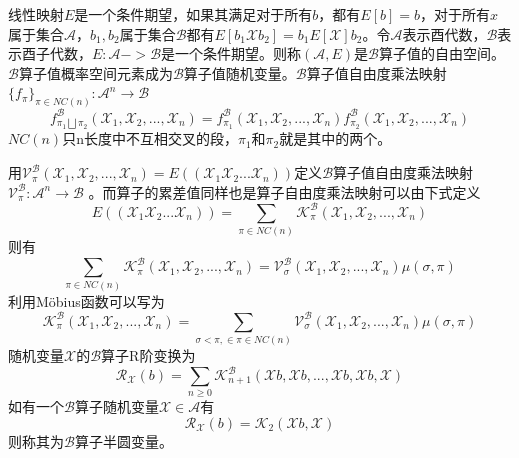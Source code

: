 \documentclass[bachelor,nocolorlinks, printoneside]{seuthesis} %
\begin{document}
\begin{Main}
线性映射$E$是一个条件期望，如果其满足对于所有$b$，都有$E[b]=b$，对于所有$x$属于集合$\mathcal{A}$，$b_1,b_2$属于集合$\mathcal{B}$都有$E[b_1\mathcal{X}b_2]= b_1E[\mathcal{X}]b_2$。令$\mathcal{A}$表示酉代数，$\mathcal{B}$表示酉子代数，$E:\mathcal{A}->\mathcal{B}$是一个条件期望。则称$(\mathcal{A},E)$是$\mathcal{B}$算子值的自由空间。$\mathcal{B}$算子值概率空间元素成为$\mathcal{B}$算子值随机变量。$\mathcal{B}$算子值自由度乘法映射$\lbrace f_{\pi} \rbrace _{\pi \in NC(n)}:\mathcal{A}^n \rightarrow \mathcal{B}$
\begin{equation}\label{key}
f_{\pi_1 \bigsqcup \pi_2}^{\mathcal{B}}(\mathcal{X}_1,\mathcal{X}_2,...,\mathcal{X}_n) = f_{\pi_1}^{\mathcal{B}}(\mathcal{X}_1,\mathcal{X}_2,...,\mathcal{X}_n)f_{\pi_2}^{\mathcal{B}}(\mathcal{X}_1,\mathcal{X}_2,...,\mathcal{X}_n)
\end{equation}
$NC(n)$只n长度中不互相交叉的段，$\pi_1$和$\pi_2$就是其中的两个。

用$\mathcal{V}_{\pi}^{\mathcal{B}}(\mathcal{X}_1,\mathcal{X}_2,...,\mathcal{X}_n) = E((\mathcal{X}_1\mathcal{X}_2...\mathcal{X}_n))$定义$\mathcal{B}$算子值自由度乘法映射$\mathcal{V}_{\pi}^{\mathcal{B}} :\mathcal{A}^n \rightarrow \mathcal{B}$
。而算子的累差值同样也是算子自由度乘法映射可以由下式定义
\begin{equation}\label{key}
E((\mathcal{X}_1\mathcal{X}_2...\mathcal{X}_n)) = \sum_{\pi \in NC(n)} \mathcal{K}_{\pi}^{\mathcal{B}}(\mathcal{X}_1,\mathcal{X}_2,...,\mathcal{X}_n)
\end{equation}
则有
\begin{equation}\label{key}
\sum_{\pi \in NC(n)} \mathcal{K}_{\pi}^{\mathcal{B}}(\mathcal{X}_1,\mathcal{X}_2,...,\mathcal{X}_n) = \mathcal{V}_{\sigma}^{\mathcal{B}}(\mathcal{X}_1,\mathcal{X}_2,...,\mathcal{X}_n)\mu(\sigma,\pi)
\end{equation}
利用M\"{o}bius函数可以写为
\begin{equation}\label{key}
\mathcal{K}_{\pi}^{\mathcal{B}}(\mathcal{X}_1,\mathcal{X}_2,...,\mathcal{X}_n) = \sum_{\sigma<\pi, \in \pi \in NC(n)} \mathcal{V}_{\sigma}^{\mathcal{B}}(\mathcal{X}_1,\mathcal{X}_2,...,\mathcal{X}_n)\mu(\sigma,\pi)
\end{equation}
随机变量$\mathcal{X}$的$\mathcal{B}$算子R阶变换为
\begin{equation}\label{key}
\mathcal{R}_{\mathcal{X}}(b)=\sum_{n \geq 0} \mathcal{K}_{n+1}^{\mathcal{B}}(\mathcal{X}b,\mathcal{X}b,...,\mathcal{X}b,\mathcal{X}b,\mathcal{X})
\end{equation}
如有一个$\mathcal{B}$算子随机变量$\mathcal{X} \in \mathcal{A}$有
\begin{equation}\label{key}
\mathcal{R}_{\mathcal{X}}(b)=\mathcal{K}_2(\mathcal{X}b,\mathcal{X})
\end{equation}
则称其为$\mathcal{B}$算子半圆变量。


\end{Main}
\end{document}
